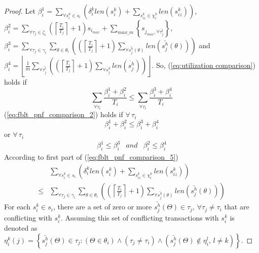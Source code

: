 \documentclass[conference,letterpaper]{IEEEtran}
\begin{document}
\begin{proof}
Let $\beta_{i}^{1}=\sum_{\forall s_{i}^{k}\in s_{i}}\left(\delta_{i}^{k}len(s_{i}^{k})+\sum_{s_{iz}^{k}\in\chi_{i}^{k}}len(s_{iz}^{k})\right)$,
$\beta_{i}^{2}=\sum_{\forall\tau_{j}\in\zeta_{i}}\left(\left\lceil \frac{T_{i}}{T_{j}}\right\rceil +1\right)s_{i_{max}}+\sum_{max\_m}\left\{ s_{j_{max},\forall\bar{\tau_{j}^{l}}}\right\} $,
$\beta_{i}^{3}=\sum_{\forall\tau_{j}\in\gamma_{i}}\sum_{\theta\in\theta_{i}}\left(\left(\left\lceil \frac{T_{i}}{T_{j}}\right\rceil +1\right)\sum_{\forall\bar{s_{j}^{h}}(\theta)}len\left(\bar{s_{j}^{h}}(\theta)\right)\right)$
and $\beta_{i}^{4}=\left\lfloor \frac{1}{m}\sum_{\forall\bar{\tau_{j}^{l}}}\left(\left(\left\lceil \frac{T_{i}}{T_{j}}\right\rceil +1\right)\sum_{\forall\ddot{s_{j}^{h}}}len\left(\ddot{s_{j}^{h}}\right)\right)\right\rfloor $.
%
So, (\ref{eq:utilization comparison}) holds if 
\begin{equation}
\sum_{\forall\tau_{i}}\frac{\beta_{i}^{1}+\beta_{i}^{2}}{T_{i}}
\le \sum_{\forall\tau_{i}}\frac{\beta_{i}^{3}+\beta_{i}^{4}}{T_{i}}\label{eq:fblt_pnf_comparison_2}
\end{equation}
%
(\ref{eq:fblt_pnf_comparison_2}) holds if $\forall\,\tau_{i}$
\begin{equation}
\beta_{i}^{1}+\beta_{i}^{2}\le\beta_{i}^{3}+\beta_{i}^{4}\label{eq:fblt_pnf_comparison_3}
\end{equation}
or $\forall\,\tau_{i}$ 
%
\begin{eqnarray}
\beta_{i}^{1}\le\beta_{i}^{3} & and & \beta_{i}^{2}\le\beta_{i}^{4}\label{eq:fblt_pnf_comparison_5}
\end{eqnarray}
%
According to first part of (\ref{eq:fblt_pnf_comparison_5})
\begin{eqnarray}
 & \sum_{\forall s_{i}^{k}\in s_{i}}\left(\delta_{i}^{k}len(s_{i}^{k})+\sum_{s_{iz}^{k}\in\chi_{i}^{k}}len(s_{iz}^{k})\right)\label{eq:fblt_pnf_comparison_6}\\
\le & \sum_{\forall\tau_{j}\in\gamma_{i}}\sum_{\theta\in\theta_{i}}\left(\left(\left\lceil \frac{T_{i}}{T_{j}}\right\rceil +1\right)\sum_{\forall\bar{s_{j}^{h}}(\theta)}len\left(\bar{s_{j}^{h}}(\theta)\right)\right)\nonumber 
\end{eqnarray}
For each $s_{i}^{k}\in s_{i}$, there are a set of zero or more $\bar{s_{j}^{h}}(\Theta)\in\tau_{j},\,\forall\tau_{j}\ne\tau_{i}$
that are conflicting with $s_{i}^{k}$. Assuming this set of conflicting
transactions with $s_{i}^{k}$ is denoted as $\eta_{i}^{k}(j)=\left\{ \bar{s_{j}^{h}}(\Theta)\in\tau_{j}:\left(\Theta\in\theta_{i}\right)\wedge\left(\tau_{j}\ne\tau_{i}\right)\wedge\left(\bar{s_{j}^{h}}(\Theta)\not\in\eta_{i}^{l},\, l\ne k\right)\right\} $.

\end{proof}
\end{document}
